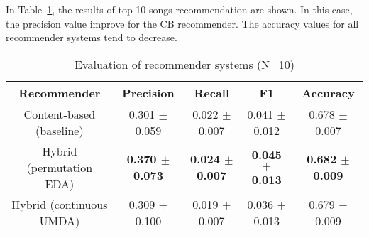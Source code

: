 In Table~\ref{table:recn10}, the results of top-10 songs recommendation are shown. In this case, the precision value improve for the CB recommender. The accuracy values for all recommender systems tend to decrease.
\begin{table}[h!]
	\caption{Evaluation of recommender systems (N=10)} %
	\centering %
	\begin{adjustbox}{max width=\textwidth}
		\begin{tabular}{c c c c c} %
			\hline\hline %
			Recommender & Precision & Recall & F1 & Accuracy \\ [0.5ex] %
			\hline %
			Content-based (baseline) & 0.301 $\pm$ 0.059 & 0.022 $\pm$ 0.007 & 0.041 $\pm$ 0.012 & 0.678 $\pm$ 0.007 \\ %
			Hybrid (permutation EDA) & \textbf{0.370 $\pm$ 0.073} & \textbf{0.024 $\pm$ 0.007} & \textbf{0.045 $\pm$ 0.013} & \textbf{0.682 $\pm$ 0.009} \\
			Hybrid (continuous UMDA) & 0.309 $\pm$ 0.100 & 0.019 $\pm$ 0.007 & 0.036 $\pm$ 0.013 & 0.679 $\pm$ 0.009 \\ [1ex] %
			\hline %
		\end{tabular}
	\end{adjustbox}
	\label{table:recn10} %
\end{table}

